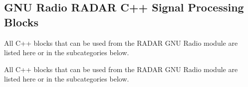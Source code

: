 \subsection{G\+NU Radio R\+A\+D\+AR C++ Signal Processing Blocks}
\label{group__block}


All C++ blocks that can be used from the R\+A\+D\+AR G\+NU Radio module are listed here or in the subcategories below.  


All C++ blocks that can be used from the R\+A\+D\+AR G\+NU Radio module are listed here or in the subcategories below. 

